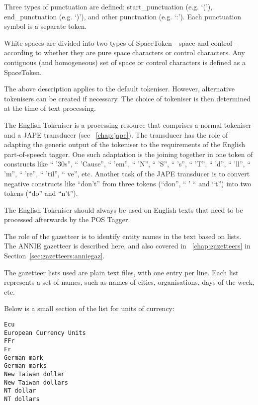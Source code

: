 Three types of punctuation are defined: start\_punctuation (e.g. `('),
end\_punctuation (e.g. `)'), and other punctuation (e.g. `:'). Each
punctuation symbol is a separate token.


White spaces are divided into two types of SpaceToken - space and
control - according to whether they are pure space characters or
control characters. Any contiguous (and homogeneous) set of space or
control characters is defined as a SpaceToken.

The above description applies to the default tokeniser. However,
alternative tokenisers can be created if necessary. The choice of
tokeniser is then determined at the time of text processing.


The English Tokeniser is a processing resource that comprises a normal
tokeniser and a JAPE transducer (see \Chapthing~\ref{chap:jape}). The
transducer has the role of adapting the generic output of the
tokeniser to the requirements of the English part-of-speech
tagger. One such adaptation is the joining together in one token of
constructs like `` '30s'', `` 'Cause'', `` 'em'', `` 'N'', `` 'S'', ``
's'', `` 'T'', `` 'd'', `` 'll'', `` 'm'', `` 're'', `` 'til'', ``
ve'', etc. Another task of the JAPE transducer is to convert negative
constructs like ``don't'' from three tokens (``don'', `` ' `` and
``t'') into two tokens (``do'' and ``n't'').

The English Tokeniser should always be used on English texts that need
to be processed afterwards by the POS Tagger.



The role of the gazetteer is to identify entity names in the text based on
lists. The ANNIE gazetteer is described here, and also covered in
\Chapthing~\ref{chap:gazetteers} in Section~\ref{sec:gazetteers:anniegaz}.

The gazetteer lists used are plain text files, with one entry per
line. Each list represents a set of names, such as names
of cities, organisations, days of the week, etc.

Below is a small section of the list for units of currency:
\begin{small}
\begin{verbatim}
Ecu
European Currency Units
FFr
Fr
German mark
German marks
New Taiwan dollar
New Taiwan dollars
NT dollar
NT dollars
\end{verbatim}
\end{small}

